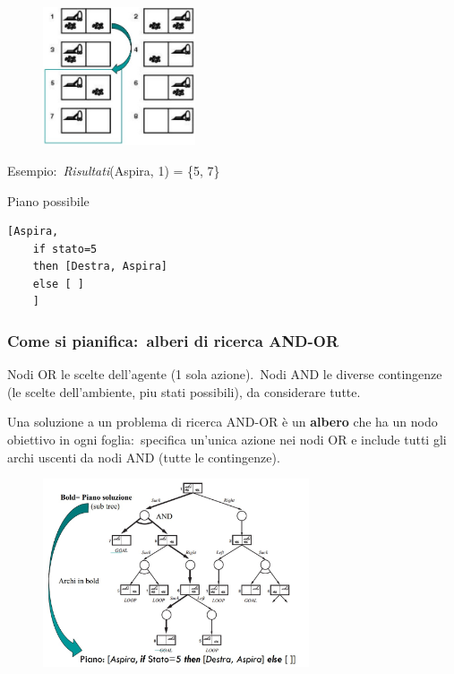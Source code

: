 \begin{figure}[H]
	\centering
	\includegraphics[width=0.4\textwidth]{immagini/nDeterm.jpg}
\end{figure}
\noindent Esempio:\ \textit{Risultati}(Aspira, 1) = \{5, 7\}

\noindent Piano possibile

\begin{verbatim}
[Aspira,
    if stato=5
	then [Destra, Aspira]
    else [ ]
    ]
\end{verbatim}

\subsubsection{Come si pianifica:\ alberi di ricerca AND-OR}

Nodi OR le scelte dell'agente (1 sola azione).\
Nodi AND le diverse contingenze (le scelte dell'ambiente, piu stati possibili), da considerare tutte.\

Una soluzione a un problema di ricerca AND-OR è un \textbf{albero} che ha un nodo obiettivo in ogni foglia:\ specifica un'unica azione nei nodi OR e include tutti gli archi uscenti da nodi AND (tutte le contingenze).

\begin{figure}[H]
	\centering
	\includegraphics[width=0.7\textwidth]{immagini/AND-OR.jpg}
\end{figure}
